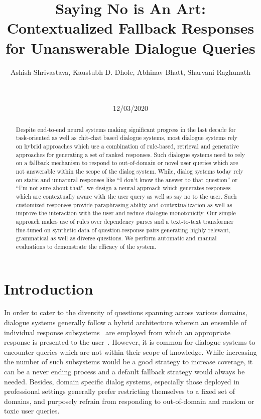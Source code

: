 \documentclass[11pt,a4paper]{article}
\title{Saying No is An Art: Contextualized Fallback Responses for Unanswerable Dialogue Queries}
\author{%
Ashish Shrivastava\affmark[1], Kaustubh D. Dhole\affmark[1], Abhinav Bhatt\affmark[2], Sharvani Raghunath\affmark[1]\\
\affaddr{\affmark[1]Amelia Science, IPsoft R\&D} \hspace{2cm} \affaddr{\affmark[2]Universität des Saarlandes}\\
\email{\affmark[1]\{firstname.lastname\}@ipsoft.com}\\ \email{\affmark[2]abbh00001@stud.uni-saarland.de}
}
\date{12/03/2020}
\begin{document}
\maketitle
\begin{abstract}
Despite end-to-end neural systems making significant progress in the last decade for task-oriented as well as chit-chat based dialogue systems, most dialogue systems rely on hybrid approaches which use a combination of rule-based, retrieval and generative approaches for generating a set of ranked responses. Such dialogue systems need to rely on a fallback mechanism to respond to out-of-domain or novel user queries which are not answerable within the scope of the dialog system. While, dialog systems today rely on static and unnatural responses like ``I don’t know the answer to that question'' or ``I’m not sure about that", we design a neural approach which generates responses which are contextually aware with the user query as well as say no to the user. Such customized responses provide paraphrasing ability and contextualization as well as improve the interaction with the user and reduce dialogue monotonicity. Our simple approach makes use of rules over dependency parses and a text-to-text transformer fine-tuned on synthetic data of question-response pairs generating highly relevant, grammatical as well as diverse questions. We perform automatic and manual evaluations to demonstrate the efficacy of the system.
\end{abstract}

\section{Introduction}

In order to cater to the diversity of questions spanning across various domains, dialogue systems generally follow a hybrid architecture wherein an ensemble of individual response subsystems~\cite{kuratovdream,harrison2020athena} are employed from which an appropriate response is presented to the user~\cite{serban2017deep, finch2020emora, paranjape2020neural}. However, it is common for dialogue systems to encounter queries which are not within their scope of knowledge. While increasing the number of such subsystems would be a good strategy to increase coverage, it can be a never ending process and a default fallback strategy would always be needed. Besides, domain specific dialog systems, especially those deployed in professional settings generally prefer restricting themselves to a fixed set of domains, and purposely refrain from responding to out-of-domain and random or toxic user queries. 
\end{document}
